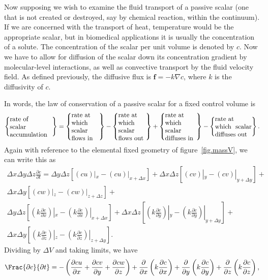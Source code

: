 \documentclass[twoside,11pt]		{report}
\begin{document}
Now supposing we wish to examine the fluid transport of a passive
scalar (\ie one that is not created or destroyed, say by chemical
reaction, within the continuum). If we are concerned with the
transport of heat, temperature would be the appropriate scalar, but in
biomedical applications it is usually the concentration of a
solute. The concentration of the scalar per unit volume is denoted by
$c$. Now we have to allow for diffusion of the scalar down its
concentration gradient by molecular-level interactions, as well as
convective transport by the fluid velocity field. As defined
previously, the diffusive flux is $\bm{f}=-k\nabla c$, where $k$ is
the diffusivity of $c$.

In words, the law of conservation of a passive
scalar for a fixed control volume is
\begin{equation}
\left\{ \parbox{23mm}{rate of\\ scalar\\ accumulation} \right\}=
\left\{ \parbox{15mm}{rate at\\ which scalar flows in} \right\}-
\left\{ \parbox{15mm}{rate at\\ which scalar flows out} \right\}+
\left\{ \parbox{17mm}{rate at\\ which scalar diffuses in} \right\}-
\left\{ \parbox{20mm}{rate at\\ which scalar diffuses out} \right\}.
\label{eq.scalar_bal_words}
\end{equation}
Again with reference to the elemental fixed geometry of
figure~\ref{fig.massV}, we can write this as
\begin{multline}
\Delta x\Delta y\Delta z\frac{\partial c}{\partial t}=
\Delta y\Delta z\left[(c u)|_{x}-(c u)|_{x+\Delta x}\right]+
\Delta x\Delta z\left[(c v)|_{y}-(c v)|_{y+\Delta y}\right]+\\
\Delta x\Delta y\left[(c w)|_{z}-(c w)|_{z+\Delta z}\right]+\\
\Delta y\Delta z\left[(k \frac{\partial c}{\partial x})|_{x}-(k
  \frac{\partial c}{\partial x})|_{x+\Delta x}\right]+
\Delta x\Delta z\left[(k \frac{\partial c}{\partial y})|_{y}-(k
  \frac{\partial c}{\partial y})|_{y+\Delta y}\right]+\\
\Delta x\Delta y\left[(k \frac{\partial c}{\partial z})|_{z}-(k
  \frac{\partial c}{\partial z})|_{z+\Delta y}\right].
\end{multline}
Dividing by $\Delta V$ and taking limits, we have
\begin{equation}
\Frac{\partial c}{\partial t}=
-\left(\frac{\partial cu}{\partial x}+\frac{\partial cv}{\partial
  y}+\frac{\partial cw}{\partial z}\right) + \frac{\partial}{\partial
  x}\left(k\frac{\partial c}{\partial x}\right)+ \frac{\partial}{\partial
  y}\left(k\frac{\partial c}{\partial y}\right)+ \frac{\partial}{\partial
  z}\left(k\frac{\partial c}{\partial z}\right),
\end{equation}
\end{document}

